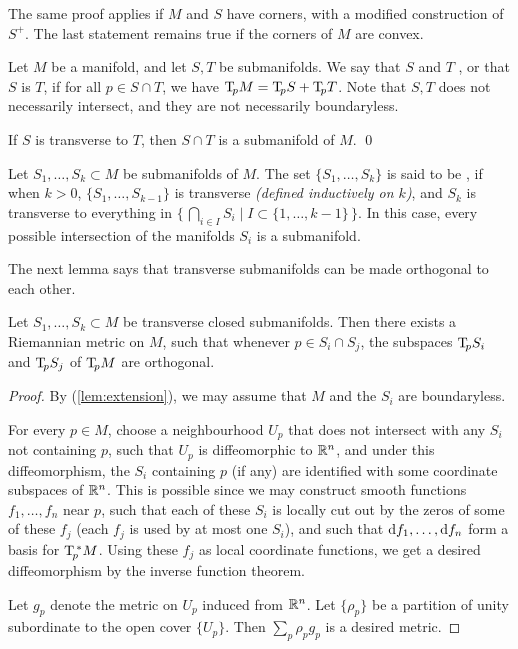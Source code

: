 \begin{remark}
The same proof applies if $M$ and $S$ have corners,
with a modified construction of $S^+$.
The last statement remains true
if the corners of $M$ are convex. \varqed
\end{remark}

\begin{definition}
Let $M$ be a manifold, and let $S,T$ be submanifolds.
We say that $S$ and $T$ ,
or that $S$ is  $T$,
if for all $p\in S\cap T$, we have $\mathrm{T}\!_pM=\mathrm{T}\!_pS+\mathrm{T}\!_pT$.
Note that $S,T$ does not necessarily intersect, and they are not necessarily boundaryless.
\end{definition}

\begin{proposition} \label{thm-transverse}
If $S$ is transverse to $T$,
then $S\cap T$ is a submanifold of $M$.
\qed
\end{proposition}

\begin{definition}
Let $S_1,\dotsc,S_k\subset M$ be submanifolds of $M$.
The set $\{S_1,\dotsc,S_k\}$ is said to be ,
if when $k>0$, $\{S_1,\dotsc,S_{k-1}\}$ is transverse \emph{(defined inductively on $k$)},
and $S_k$ is transverse to everything in
$\bigl\{\,\bigcap_{i\in I}S_i\mid I\subset\{1,\dotsc,k-1\}\,\bigr\}$.
In this case, every possible intersection of the manifolds $S_i$ is a submanifold.
\end{definition}

The next lemma says that 
transverse submanifolds can be made orthogonal to each other.

\begin{lemma}\label{lem:orthogonal}
Let $S_1,\dotsc,S_k\subset M$ be transverse closed submanifolds.
Then there exists a Riemannian metric on $M$,
such that whenever $p\in S_i\cap S_j$,
the subspaces $\mathrm{T}\!_pS_i$ and $\mathrm{T}\!_pS_j$ of $\mathrm{T}\!_pM$ are orthogonal.
\end{lemma}

\begin{proof}
By (\ref{lem:extension}), we may assume that
$M$ and the $S_i$ are boundaryless.

For every $p\in M$, choose a neighbourhood $U_p$ that
does not intersect with any $S_i$ not containing $p$,
such that $U_p$ is diffeomorphic to $\mathbb{R}^n$, and under this diffeomorphism,
the $S_i$ containing $p$ (if any) are identified with some coordinate subspaces of $\mathbb{R}^n$.
This is possible since we may construct
smooth functions $f_1,\dotsc,f_n$ near $p$,
such that each of these $S_i$ is locally cut out by the zeros of some of these $f_j$
(each $f_j$ is used by at most one $S_i$),
and such that $\mathrm{d} f_1,\dotsc,\mathrm{d} f_n$ form a basis for $\mathrm{T}_{\!p}^{\,*}M$.
Using these $f_j$ as local coordinate functions,
we get a desired diffeomorphism by the inverse function theorem.

Let $g_p$ denote the metric on $U_p$ induced from $\mathbb{R}^n$.
Let $\{\rho_p\}$ be a partition of unity subordinate to the open cover $\{U_p\}$.
Then $\sum_p\rho_pg_p$ is a desired metric.
\end{proof}

